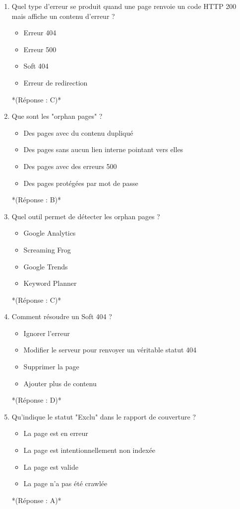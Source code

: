 \documentclass[12pt,a4paper,twoside]{report}
\begin{document}
\begin{enumerate}
\item Quel type d'erreur se produit quand une page renvoie un code HTTP 200 mais affiche un contenu d'erreur ?
\begin{itemize}
\item[A)] Erreur 404
\item[B)] Erreur 500
\item[C)] Soft 404
\item[D)] Erreur de redirection
\end{itemize}
*(Réponse : C)*

\item Que sont les "orphan pages" ?
\begin{itemize}
\item[A)] Des pages avec du contenu dupliqué
\item[B)] Des pages sans aucun lien interne pointant vers elles
\item[C)] Des pages avec des erreurs 500
\item[D)] Des pages protégées par mot de passe
\end{itemize}
*(Réponse : B)*

\item Quel outil permet de détecter les orphan pages ?
\begin{itemize}
\item[A)] Google Analytics
\item[B)] Screaming Frog
\item[C)] Google Trends
\item[D)] Keyword Planner
\end{itemize}
*(Réponse : C)*

\item Comment résoudre un Soft 404 ?
\begin{itemize}
\item[A)] Ignorer l'erreur
\item[B)] Modifier le serveur pour renvoyer un véritable statut 404
\item[C)] Supprimer la page
\item[D)] Ajouter plus de contenu
\end{itemize}
*(Réponse : D)*

\item Qu'indique le statut "Exclu" dans le rapport de couverture ?
\begin{itemize}
\item[A)] La page est en erreur
\item[B)] La page est intentionnellement non indexée
\item[C)] La page est valide
\item[D)] La page n'a pas été crawlée
\end{itemize}
*(Réponse : A)*


\end{enumerate}
\end{document}
